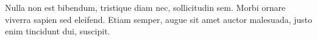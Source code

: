 \documentclass[12pt,twoside,openright,a5paper]{book}
\begin{document}
Nulla non est bibendum, tristique diam nec, sollicitudin sem. Morbi ornare viverra sapien sed eleifend. Etiam semper, augue sit amet auctor malesuada, justo enim tincidunt dui, suscipit.


%



%















%






\end{document}
